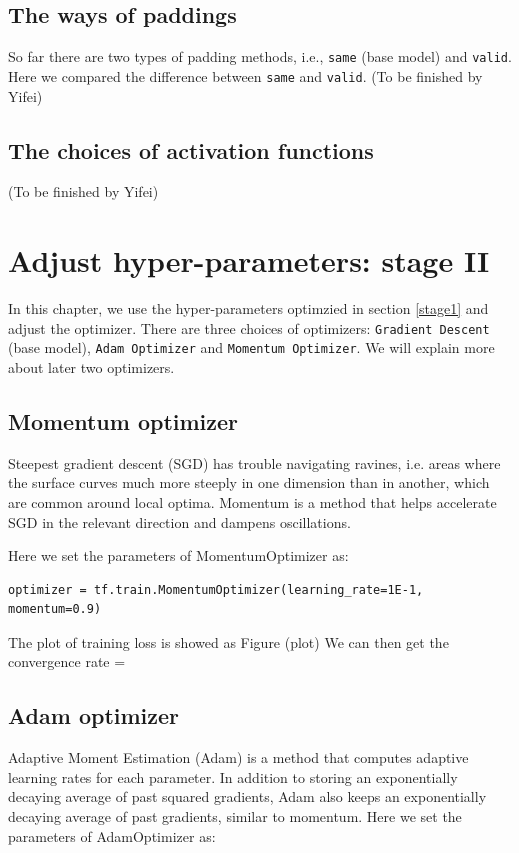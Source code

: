 \documentclass[11pt]{article}
\begin{document}
\subsection{The ways of paddings}
So far there are two types of padding methods, i.e., {\tt same} (base model) and {\tt valid}. Here we compared the difference between {\tt same} and {\tt valid}.
(To be finished by Yifei)

\subsection{The choices of activation functions}
(To be finished by Yifei)



\clearpage
\section{Adjust hyper-parameters: stage II}
\label{stage2}
In this chapter, we use the hyper-parameters optimzied in section \ref{stage1} and adjust the optimizer. There are three choices of optimizers: {\tt Gradient Descent} (base model), {\tt Adam Optimizer} and {\tt Momentum Optimizer}. We will explain more about later two optimizers.

\subsection{Momentum optimizer}
Steepest gradient descent (SGD) has trouble navigating ravines, i.e. areas where the surface curves much more steeply in one dimension than in another, which are common around local optima. Momentum is a method that helps accelerate SGD in the relevant direction and dampens oscillations. 

Here we set the parameters of MomentumOptimizer as: 

\begin{lstlisting}
optimizer = tf.train.MomentumOptimizer(learning_rate=1E-1, momentum=0.9)
\end{lstlisting}


The plot of training loss is showed as Figure
(plot)
We can then get the convergence rate = 


\subsection{Adam optimizer}
Adaptive Moment Estimation (Adam) is a method that computes adaptive learning rates for each parameter. In addition to storing an exponentially decaying average of past squared gradients, Adam also keeps an exponentially decaying average of past gradients, similar to momentum.
Here we set the parameters of AdamOptimizer as: 
\end{document}
